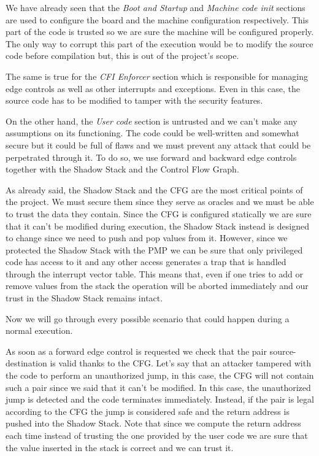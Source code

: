 We have already seen that the \textit{Boot and Startup} and \textit{Machine code
init} sections are used to configure the board and the machine configuration respectively.
This part of the code is trusted so we are sure the machine will be configured
properly. The only way to corrupt this part of the execution would be to modify the
source code before compilation but, this is out of the project's scope.

The same is true for the \textit{CFI Enforcer} section which is responsible for managing
edge controls as well as other interrupts and exceptions. Even in this case, the
source code has to be modified to tamper with the security features.

On the other hand, the \textit{User code} section is untrusted and we can't make
any assumptions on its functioning. The code could be well-written and somewhat
secure but it could be full of flaws and we must prevent any attack that could
be perpetrated through it. To do so, we use forward and backward edge controls
together with the Shadow Stack and the Control Flow Graph.

As already said, the Shadow Stack and the CFG are the most critical points of the
project. We must secure them since they serve as oracles and we must be able to
trust the data they contain. Since the CFG is configured statically we are sure that
it can't be modified during execution, the Shadow Stack instead is designed to
change since we need to push and pop values from it. However, since we protected
the Shadow Stack with the PMP we can be sure that only privileged code has
access to it and any other access generates a trap that is handled through the
interrupt vector table. This means that, even if one tries to add or remove
values from the stack the operation will be aborted immediately and our trust in
the Shadow Stack remains intact.

Now we will go through every possible scenario that could happen during a normal
execution.

As soon as a forward edge control is requested we check that the pair source-destination
is valid thanks to the CFG. Let's say that an attacker tampered with the code to
perform an unauthorized jump, in this case, the CFG will not contain such a pair
since we said that it can't be modified. In this case, the unauthorized jump is detected
and the code terminates immediately. Instead, if the pair is legal according to the
CFG the jump is considered safe and the return address is pushed into the Shadow
Stack. Note that since we compute the return address each time instead of
trusting the one provided by the user code we are sure that the value inserted
in the stack is correct and we can trust it.

